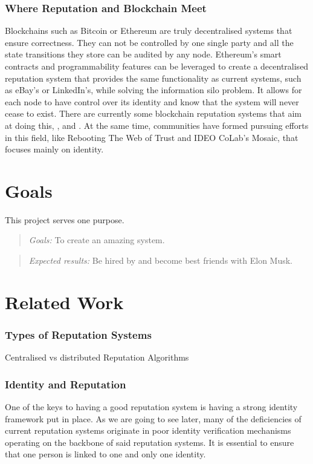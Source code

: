 \documentclass[llncsdoc]{llncs}
\begin{document}
\subsubsection{Where Reputation and Blockchain Meet}
Blockchains such as Bitcoin or Ethereum are truly decentralised systems that ensure correctness. They can not be controlled by one single party and all the state transitions they store can be audited by any node. Ethereum's smart contracts and programmability features can be leveraged to create a decentralised reputation system that provides the same functionality as current systems, such as eBay's or LinkedIn's, while solving the information silo problem. It allows for each node to have control over its identity and know that the system will never cease to exist. There are currently some blockchain reputation systems that aim at doing this, \cite{Dennis:2016um}, \cite{Yasin:2016ja} and \cite{Buechler:2015tv}. At the same time, communities have formed pursuing efforts in this field, like Rebooting The Web of Trust and IDEO CoLab's Mosaic, that focuses mainly on identity.



\section{Goals}
\label{sec:goals}

This project serves one purpose.
 
\begin{quotation} 
\textit{Goals:} To create an amazing system.
\end{quotation} 
 
\begin{quotation} 
  \textit{Expected results:} Be hired by and become best friends with Elon Musk.
\end{quotation} 

\section{Related Work}
\label{sec:rwork}

\subsubsection{Types of Reputation Systems}
Centralised vs distributed
Reputation Algorithms



\subsubsection{Identity and Reputation}
One of the keys to having a good reputation system is having a strong identity framework put in place. As we are going to see later, many of the deficiencies of current reputation systems originate in poor identity verification mechanisms operating on the backbone of said reputation systems. It is essential to ensure that one person is linked to one and only one identity.
\end{document}
